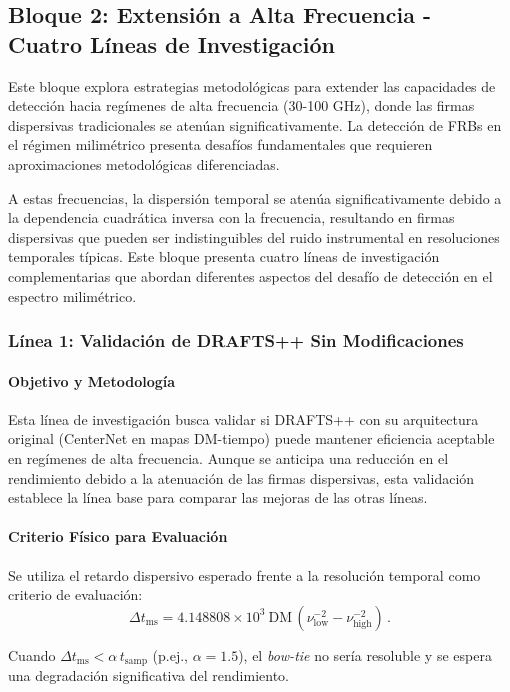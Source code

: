 \subsection{Bloque 2: Extensión a Alta Frecuencia - Cuatro Líneas de Investigación}

Este bloque explora estrategias metodológicas para extender las capacidades de detección hacia regímenes de alta frecuencia (30-100 GHz), donde las firmas dispersivas tradicionales se atenúan significativamente. La detección de FRBs en el régimen milimétrico presenta desafíos fundamentales que requieren aproximaciones metodológicas diferenciadas.

A estas frecuencias, la dispersión temporal se atenúa significativamente debido a la dependencia cuadrática inversa con la frecuencia, resultando en firmas dispersivas que pueden ser indistinguibles del ruido instrumental en resoluciones temporales típicas. Este bloque presenta cuatro líneas de investigación complementarias que abordan diferentes aspectos del desafío de detección en el espectro milimétrico.

\subsubsection{Línea 1: Validación de DRAFTS++ Sin Modificaciones}

\paragraph{Objetivo y Metodología}

Esta línea de investigación busca validar si DRAFTS++ con su arquitectura original (CenterNet en mapas DM-tiempo) puede mantener eficiencia aceptable en regímenes de alta frecuencia. Aunque se anticipa una reducción en el rendimiento debido a la atenuación de las firmas dispersivas, esta validación establece la línea base para comparar las mejoras de las otras líneas.

\paragraph{Criterio Físico para Evaluación}

Se utiliza el retardo dispersivo esperado frente a la resolución temporal como criterio de evaluación:
\[
\Delta t_{\mathrm{ms}} = 4.148808 \times 10^{3}\ \mathrm{DM}\,(\nu_{\mathrm{low}}^{-2}-\nu_{\mathrm{high}}^{-2}) \, .
\]

Cuando $\Delta t_{\mathrm{ms}} < \alpha\, t_{\mathrm{samp}}$ (p.ej., $\alpha\!=\!1.5$), el \textit{bow-tie} no sería resoluble y se espera una degradación significativa del rendimiento.

